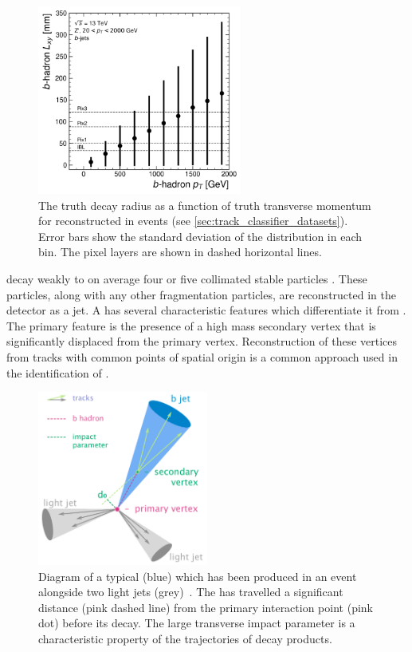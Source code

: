 \begin{figure}[!htbp]
  \centering
  \includegraphics[width=0.6\textwidth]{chapters/3.tracking/figs/b_pt_lxy.pdf}
  \caption{
    The truth \bhadron decay radius \Lxy as a function of truth transverse momentum \pt for reconstructed \bjets in \Zprime events (see \cref{sec:track_classifier_datasets}).
    Error bars show the standard deviation of the \Lxy distribution in each \pt bin.
    The pixel layers are shown in dashed horizontal lines.
  }
  \label{fig:b_lxy_vs_pt}
\end{figure}

\bhadrons decay weakly to on average four or five collimated stable particles \cite{ATL-PHYS-PUB-2014-008}.
These particles, along with any other fragmentation particles, are reconstructed in the detector as a jet.
A \bjet has several characteristic features which differentiate it from \ljets.
The primary feature is the presence of a high mass secondary vertex that is significantly displaced from the primary vertex.
Reconstruction of these vertices from tracks with common points of spatial origin is a common approach used in the identification of \bjets.


\begin{figure}[!tbp]
  \centering
  \includegraphics[width=0.5\textwidth]{chapters/3.tracking/figs/b-jet-diagram.png}
  \caption{
    Diagram of a typical \bjet (blue) which has been produced in an event alongside two light jets (grey)~\cite{bjetdiagram}.
    The \bhadron has travelled a significant distance (pink dashed line) from the primary interaction point (pink dot) before its decay.
    The large transverse impact parameter \dzero is a characteristic property of the trajectories of \bhadron decay products.}
  \label{fig:bjet_diagram}
\end{figure}


